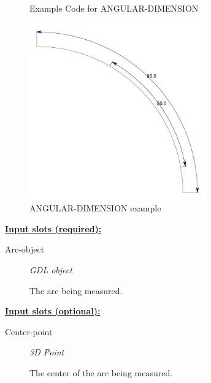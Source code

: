 \documentclass [11pt]{book}
\begin{document}
\begin{itemize}
\begin{figure}
\caption{Example Code for ANGULAR-DIMENSION}

\label{fig:example-code-ANGULAR-DIMENSION}

\end{figure}

\begin{figure}
\begin{center}
\includegraphics[width=3in,height=3in]{../images/example-angular-dimension.pdf}
\end{center}

\caption{ANGULAR-DIMENSION example}

\label{fig:ANGULAR-DIMENSION}

\end{figure}





\textbf{
\underline{Input slots (required):}}

\begin{description}

\item [Arc-object]
\emph{GDL object}

 The arc being measured.




\end{description}






\textbf{
\underline{Input slots (optional):}}

\begin{description}

\item [Center-point]
\emph{3D Point}

 The center of the arc being measured.





\end{description}
\end{itemize}
\end{document}
